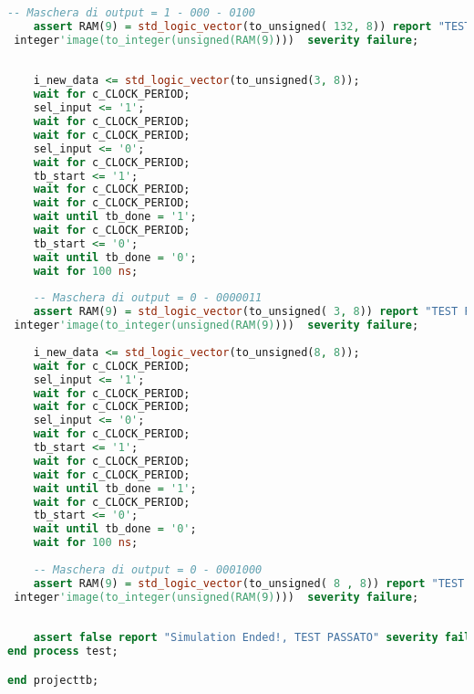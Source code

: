 \documentclass [a4paper, 12pt]{article}
\begin{document}
\begin{lstlisting}[language=VHDL, caption=tb\_pfrl\_2020\_repeated.vhd, basicstyle=\tiny, breaklines]
    -- Maschera di output = 1 - 000 - 0100
    assert RAM(9) = std_logic_vector(to_unsigned( 132, 8)) report "TEST FALLITO. Expected  132  found " &
 integer'image(to_integer(unsigned(RAM(9))))  severity failure;
    
    
    i_new_data <= std_logic_vector(to_unsigned(3, 8));
    wait for c_CLOCK_PERIOD;
    sel_input <= '1';
    wait for c_CLOCK_PERIOD;
    wait for c_CLOCK_PERIOD;
    sel_input <= '0';
    wait for c_CLOCK_PERIOD;
    tb_start <= '1';
    wait for c_CLOCK_PERIOD;
    wait for c_CLOCK_PERIOD;
    wait until tb_done = '1';
    wait for c_CLOCK_PERIOD;
    tb_start <= '0';
    wait until tb_done = '0';
    wait for 100 ns;
    
    -- Maschera di output = 0 - 0000011
    assert RAM(9) = std_logic_vector(to_unsigned( 3, 8)) report "TEST FALLITO. Expected  132  found " &
 integer'image(to_integer(unsigned(RAM(9))))  severity failure;
    
    i_new_data <= std_logic_vector(to_unsigned(8, 8));
    wait for c_CLOCK_PERIOD;
    sel_input <= '1';
    wait for c_CLOCK_PERIOD;
    wait for c_CLOCK_PERIOD;
    sel_input <= '0';
    wait for c_CLOCK_PERIOD;
    tb_start <= '1';
    wait for c_CLOCK_PERIOD;
    wait for c_CLOCK_PERIOD;
    wait until tb_done = '1';
    wait for c_CLOCK_PERIOD;
    tb_start <= '0';
    wait until tb_done = '0';
    wait for 100 ns;
    
    -- Maschera di output = 0 - 0001000
    assert RAM(9) = std_logic_vector(to_unsigned( 8 , 8)) report "TEST FALLITO. Expected  8  found " &
 integer'image(to_integer(unsigned(RAM(9))))  severity failure;
    
 
    assert false report "Simulation Ended!, TEST PASSATO" severity failure;
end process test;

end projecttb; 

\end{lstlisting}
\end{document}
